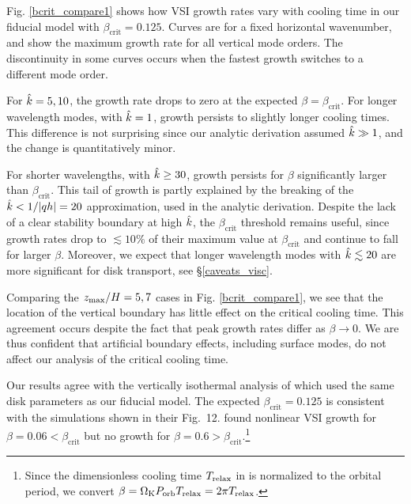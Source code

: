 Fig. \ref{bcrit_compare1} shows how VSI growth rates vary with cooling time 
in our fiducial model with $\beta_\mathrm{crit} = 0.125$.  
Curves are for a fixed horizontal wavenumber, and show the maximum growth rate for all vertical mode orders.  The 
discontinuity in some curves occurs when the fastest growth switches to a different mode order.

For $\hat{k} = 5, 10$, the growth rate drops to zero at the expected $\beta = \beta_\mathrm{crit}$.
For longer wavelength modes, with $\hat{k} = 1$, growth persists to slightly longer cooling times.  
This difference is not surprising since our analytic derivation assumed $\hat{k} \gg1$, and 
the change is quantitatively minor.

For shorter wavelengths, with $\hat{k} \geq 30$, growth persists for $\beta$ significantly larger
than $\beta_\mathrm{crit}$.  This tail of growth is partly explained by the breaking of the $\hat{k} < 1/|qh| = 20$ 
approximation, used in  the analytic derivation.  Despite the lack of a clear stability boundary 
at high $\hat{k}$, the $\beta_\mathrm{crit}$ threshold remains useful, since growth rates drop to 
$\lesssim 10\%$ of  their maximum value at  $\beta_\mathrm{crit}$ and continue to fall for larger $\beta$. 
 Moreover, we expect that longer wavelength modes with $\hat{k} \lesssim 20$
are more significant for disk transport, see \S\ref{caveats_visc}.

Comparing the $z_\mathrm{max}/H = 5, 7$ cases in Fig. \ref{bcrit_compare1}, we see that the location of the vertical
boundary has little effect on the critical cooling time.  This agreement occurs despite the fact that peak growth rates
differ as $\beta \to 0$.  We are thus confident that artificial boundary effects, including surface modes, do not
affect our analysis of the critical cooling time.

Our results agree with the vertically isothermal analysis of  
which used the same disk parameters as our fiducial model.  The expected $\beta_\mathrm{crit} = 0.125$ 
is consistent with the simulations shown in their Fig.\ 12.    
found nonlinear VSI growth for $\beta = 0.06< \beta_\mathrm{crit}$ but no growth for 
  $\beta = 0.6 > \beta_\mathrm{crit}$.\footnote{Since the dimensionless cooling time $T_{\rm relax}$ in 
  is normalized to the orbital period, we convert $\beta = \Omega_{\rm K} P_{\rm orb} T_{\rm relax} = 2 \pi T_{\rm relax}$.}

